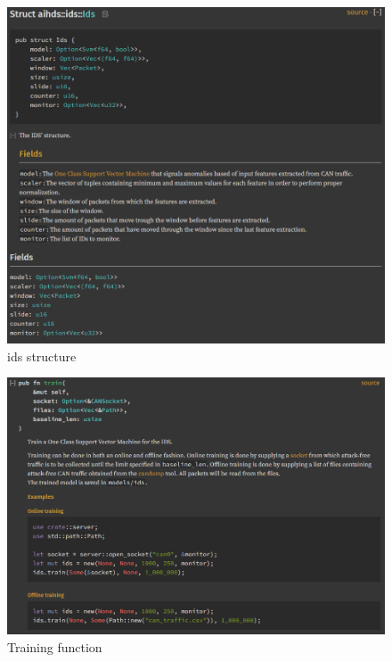 \begin{figure}
    \centering
    \includegraphics[width = \linewidth]{img/parts/docs/ids/ids_struct.png}
    \caption{\gls{ids} structure}
    \label{fig:ids_struct}
\end{figure}

\begin{figure}
    \centering
    \includegraphics[width = \linewidth]{img/parts/docs/ids/ids_struct_train.png}
    \caption{Training function}
    \label{fig:ids_train}
\end{figure}

